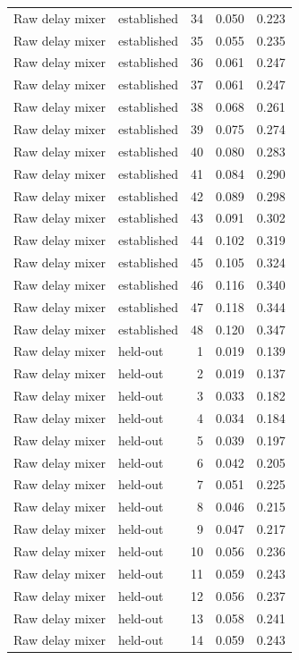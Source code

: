 \begin{tabular}{llrrr}
Raw delay mixer & established & 34 & 0.050 & 0.223 \\
Raw delay mixer & established & 35 & 0.055 & 0.235 \\
Raw delay mixer & established & 36 & 0.061 & 0.247 \\
Raw delay mixer & established & 37 & 0.061 & 0.247 \\
Raw delay mixer & established & 38 & 0.068 & 0.261 \\
Raw delay mixer & established & 39 & 0.075 & 0.274 \\
Raw delay mixer & established & 40 & 0.080 & 0.283 \\
Raw delay mixer & established & 41 & 0.084 & 0.290 \\
Raw delay mixer & established & 42 & 0.089 & 0.298 \\
Raw delay mixer & established & 43 & 0.091 & 0.302 \\
Raw delay mixer & established & 44 & 0.102 & 0.319 \\
Raw delay mixer & established & 45 & 0.105 & 0.324 \\
Raw delay mixer & established & 46 & 0.116 & 0.340 \\
Raw delay mixer & established & 47 & 0.118 & 0.344 \\
Raw delay mixer & established & 48 & 0.120 & 0.347 \\
Raw delay mixer & held-out & 1 & 0.019 & 0.139 \\
Raw delay mixer & held-out & 2 & 0.019 & 0.137 \\
Raw delay mixer & held-out & 3 & 0.033 & 0.182 \\
Raw delay mixer & held-out & 4 & 0.034 & 0.184 \\
Raw delay mixer & held-out & 5 & 0.039 & 0.197 \\
Raw delay mixer & held-out & 6 & 0.042 & 0.205 \\
Raw delay mixer & held-out & 7 & 0.051 & 0.225 \\
Raw delay mixer & held-out & 8 & 0.046 & 0.215 \\
Raw delay mixer & held-out & 9 & 0.047 & 0.217 \\
Raw delay mixer & held-out & 10 & 0.056 & 0.236 \\
Raw delay mixer & held-out & 11 & 0.059 & 0.243 \\
Raw delay mixer & held-out & 12 & 0.056 & 0.237 \\
Raw delay mixer & held-out & 13 & 0.058 & 0.241 \\
Raw delay mixer & held-out & 14 & 0.059 & 0.243 \\

\end{tabular}
